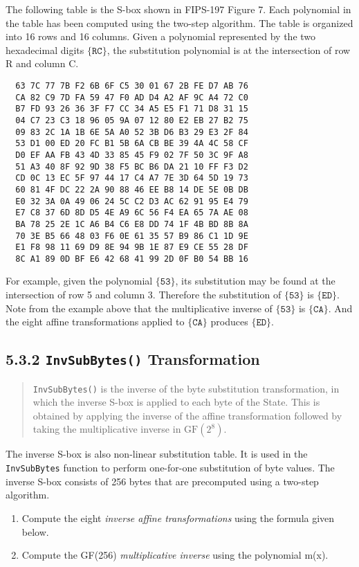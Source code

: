 \documentclass{article}
\newcommand{\GF}{\mathrm{GF}(2^8)}
\begin{document}
The following table is the S-box shown in FIPS-197 Figure 7.
Each polynomial in the table has been computed using the two-step algorithm.
The table is organized into 16 rows and 16 columns.
Given a polynomial represented by the two hexadecimal digits $\{\mathtt{RC}\}$,
the substitution polynomial is at the intersection of row R and column C.
\begin{verbatim}
  63 7C 77 7B F2 6B 6F C5 30 01 67 2B FE D7 AB 76
  CA 82 C9 7D FA 59 47 F0 AD D4 A2 AF 9C A4 72 C0
  B7 FD 93 26 36 3F F7 CC 34 A5 E5 F1 71 D8 31 15
  04 C7 23 C3 18 96 05 9A 07 12 80 E2 EB 27 B2 75
  09 83 2C 1A 1B 6E 5A A0 52 3B D6 B3 29 E3 2F 84
  53 D1 00 ED 20 FC B1 5B 6A CB BE 39 4A 4C 58 CF
  D0 EF AA FB 43 4D 33 85 45 F9 02 7F 50 3C 9F A8
  51 A3 40 8F 92 9D 38 F5 BC B6 DA 21 10 FF F3 D2
  CD 0C 13 EC 5F 97 44 17 C4 A7 7E 3D 64 5D 19 73
  60 81 4F DC 22 2A 90 88 46 EE B8 14 DE 5E 0B DB
  E0 32 3A 0A 49 06 24 5C C2 D3 AC 62 91 95 E4 79
  E7 C8 37 6D 8D D5 4E A9 6C 56 F4 EA 65 7A AE 08
  BA 78 25 2E 1C A6 B4 C6 E8 DD 74 1F 4B BD 8B 8A
  70 3E B5 66 48 03 F6 0E 61 35 57 B9 86 C1 1D 9E
  E1 F8 98 11 69 D9 8E 94 9B 1E 87 E9 CE 55 28 DF
  8C A1 89 0D BF E6 42 68 41 99 2D 0F B0 54 BB 16
\end{verbatim}

For example, given the polynomial $\{\mathtt{53}\}$, its substitution 
may be found at the intersection of row 5 and column 3.
Therefore the substitution of $\{\mathtt{53}\}$ is $\{\mathtt{ED}\}$.
Note from the example above that the multiplicative inverse 
of $\{\mathtt{53}\}$ is $\{\mathtt{CA}\}$.
And the eight affine transformations applied to 
$\{\mathtt{CA}\}$ produces $\{\mathtt{ED}\}$.


\subsection*{5.3.2 \texttt{InvSubBytes()} Transformation}

\begin{quote}
  \texttt{InvSubBytes()} is the inverse of the byte substitution transformation, 
  in which the inverse S-box is applied to each byte of the State.
  This is obtained by applying the inverse of the affine transformation
  followed by taking the multiplicative inverse in $\GF$.
\end{quote}

The inverse S-box is also non-linear substitution table.
It is used in the \texttt{InvSubBytes} function
to perform one-for-one substitution of byte values.
The inverse S-box consists of 256 bytes that are precomputed
using a two-step algorithm.
\begin{enumerate}
\item
  Compute the eight \emph{inverse affine transformations}
  using the formula given below.
\item
  Compute the GF(256) \emph{multiplicative inverse}
  using the polynomial m(x).
\end{enumerate}
\end{document}
